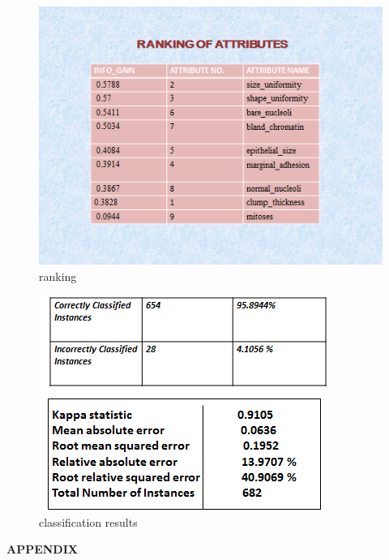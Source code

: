 \documentclass[11pt]{article}
\begin{document}
\begin{figure}[!h]
\centering
\includegraphics[scale=0.7]{rankingg}
\caption{ranking}
\label{fig_sin}

\end{figure}
\begin{figure}[!h]
\centering
\includegraphics[scale=0.7]{classification}
\caption{classification results}
\label{fig_sin}

\end{figure}




\newpage
\textbf{APPENDIX}
\end{document}

